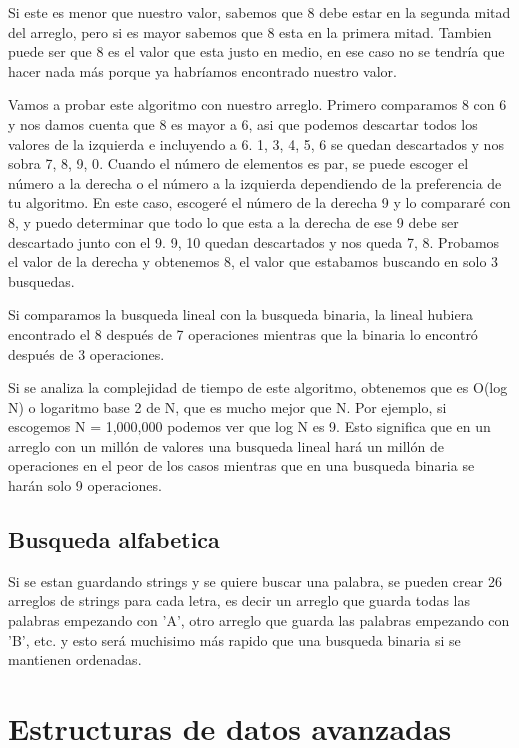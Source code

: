 \documentclass{article}
\begin{document}
Si este es menor que nuestro valor, sabemos que 8 debe estar en la segunda mitad del arreglo, pero si es mayor sabemos que 8 esta en la primera mitad. Tambien puede ser que 8 es el valor que esta justo en medio, en ese caso no se tendría que hacer nada más porque ya habríamos encontrado nuestro valor.

Vamos a probar este algoritmo con nuestro arreglo. Primero comparamos 8 con 6 y nos damos cuenta que 8 es mayor a 6, asi que podemos descartar todos los valores de la izquierda e incluyendo a 6. {1, 3, 4, 5, 6} se quedan descartados y nos sobra {7, 8, 9,  0}. Cuando el número de elementos es par, se puede escoger el número a la derecha o el número a la izquierda dependiendo de la preferencia de tu algoritmo. En este caso, escogeré el número de la derecha 9 y lo compararé con 8, y puedo determinar que todo lo que esta a la derecha de ese 9 debe ser descartado junto con el 9. {9, 10} quedan descartados y nos queda {7, 8}. Probamos el valor de la derecha y obtenemos 8, el valor que estabamos buscando en solo 3 busquedas.

Si comparamos la busqueda lineal con la busqueda binaria, la lineal hubiera encontrado el 8 después de 7 operaciones mientras que la binaria lo encontró después de 3 operaciones.

Si se analiza la complejidad de tiempo de este algoritmo, obtenemos que es O(log N) o logaritmo base 2 de N, que es mucho mejor que N. Por ejemplo, si escogemos N = 1,000,000 podemos ver que log N es 9. Esto significa que en un arreglo con un millón de valores una busqueda lineal hará un millón de operaciones en el peor de los casos mientras que en una busqueda binaria se harán solo 9 operaciones. 

\subsection{Busqueda alfabetica}

Si se estan guardando strings y se quiere buscar una palabra, se pueden crear 26 arreglos de strings para cada letra, es decir un arreglo que guarda todas las palabras empezando con 'A', otro arreglo que guarda las palabras empezando con 'B', etc. y esto será muchisimo más rapido que una busqueda binaria si se mantienen ordenadas.

\section{Estructuras de datos avanzadas}
\end{document}
